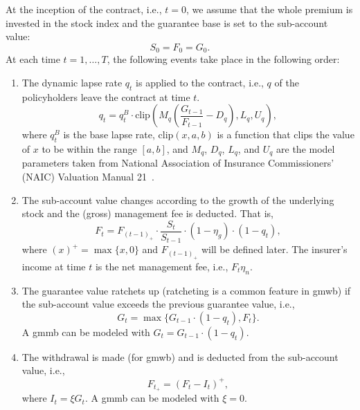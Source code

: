 At the inception of the contract, i.e., $t=0$, we assume that the whole premium is invested in the stock index and the guarantee base is set to the sub-account value:
\begin{equation*}
    S_0=F_0=G_0.
\end{equation*}
At each time $t=1,\ldots,T$, the following events take place in the following order:
\begin{enumerate}
    \item The dynamic lapse rate $q_t$ is applied to the contract, i.e., $q$ of the policyholders leave the contract at time $t$.
        \begin{equation} \label{eq3:lapse}
            q_t = q_t^B \cdot \text{clip} (M_q (\frac{G_{t-1}}{F_{t-1}} - D_q), L_q, U_q),
        \end{equation}
    where $q_t^B$ is the base lapse rate, $\text{clip}(x, a, b)$ is a function that clips the value of $x$ to be within the range $[a, b]$, and $M_q$, $D_q$, $L_q$, and $U_q$ are the model parameters taken from National Association of Insurance Commissioners’ (NAIC) Valuation Manual 21~\citep{naic2021}.
    \item The sub-account value changes according to the growth of the underlying stock and the (gross) management fee is deducted. That is, 
        \begin{equation} \label{eq3:subaccount}
            F_t = F_{(t-1)_+}\cdot\frac{S_{t}}{S_{t-1}}\cdot(1-\eta_g)\cdot(1-q_t),
        \end{equation} 
    where $(x)^+=\max\{x,0\}$ and $F_{(t-1)_+}$ will be defined later. The insurer's income at time $t$ is the net management fee, i.e., $F_t\eta_n$. 

    \item The guarantee value ratchets up (ratcheting is a common feature in \gls{gmwb}) if the sub-account value exceeds the previous guarantee value, i.e., 
        \begin{equation} \label{eq3:guarantee}
            G_t = \max\{G_{t-1}\cdot(1-q_t),F_t\}.
        \end{equation} 
    A \gls{gmmb} can be modeled with $G_t = G_{t-1}\cdot(1-q_t)$.

    \item The withdrawal is made (for \gls{gmwb}) and is deducted from the sub-account value, i.e., 
        \begin{equation} \label{eq3:withdrawal}
            F_{t_+} = (F_t - I_t)^+,
        \end{equation} 
    where $I_t = \xi G_t$. A \gls{gmmb} can be modeled with $\xi = 0$.
\end{enumerate}

